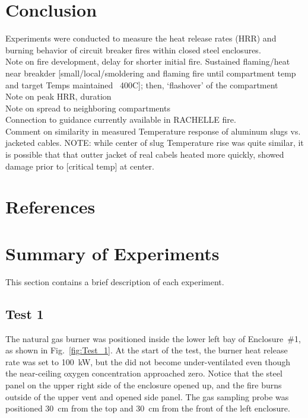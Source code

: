 \documentclass[12pt]{article}
\begin{document}
\FloatBarrier



\section{Conclusion}
Experiments were conducted to measure the heat release rates (HRR) and burning behavior of circuit breaker fires within closed steel enclosures. \\ 
Note on fire development, delay for shorter initial fire. Sustained flaming/heat near breakder [small/local/smoldering and flaming fire until compartment temp and target Temps maintained ~400C]; then, `flashover' of the compartment\\
Note on peak HRR, duration\\
Note on spread to neighboring compartments\\
Connection to guidance currently available in RACHELLE fire.\\
Comment on similarity in measured Temperature response of aluminum slugs vs. jacketed cables. NOTE: while center of slug Temperature rise was quite similar, it is possible that that outter jacket of real cabels heated more quickly, showed damage prior to [critical temp] at center.



\clearpage

\section*{References}



\clearpage

\appendix


\section{Summary of Experiments}
\label{experiments}

This section contains a brief description of each experiment.

\newpage

\subsection{Test 1}

The natural gas burner was positioned inside the lower left bay of Enclosure~\#1, as shown in Fig.~\ref{fig:Test_1}. At the start of the test, the burner heat release rate was set to 100~kW, but the did not become under-ventilated even though the near-ceiling oxygen concentration approached zero. Notice that the steel panel on the upper right side of the enclosure opened up, and the fire burns outside of the upper vent and opened side panel. The gas sampling probe was positioned 30~cm from the top and 30~cm from the front of the left enclosure.
\end{document}
